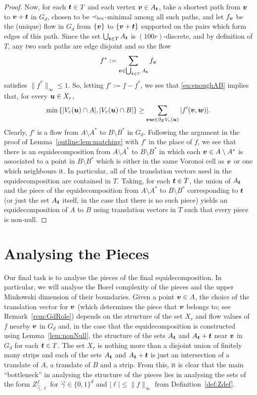 \documentclass[12pt,a4paper]{amsart}
\numberwithin{equation}{section}
\theoremstyle{definition}
\begin{document}
\begin{proof}
Now, for each $\boldsymbol{t}\in T$ and each vertex $\boldsymbol{v}\in A_{\boldsymbol{t}}$, take a shortest path from $\boldsymbol{v}$ to $\boldsymbol{v}+\boldsymbol{t}$ in $G_d$, chosen to be $\prec_{\operatorname{lex}}$-minimal among all such paths, and let $f_{\boldsymbol{v}}$ be the (unique) flow in $G_d$ from $\{\boldsymbol{v}\}$ to $\{\boldsymbol{v}+\boldsymbol{t}\}$ supported on the pairs which form edges of this path. Since the set $\bigcup_{\boldsymbol{t}\in T}A_{\boldsymbol{t}}$ is $(100r)$-discrete, and by definition of $T$, any two such paths are edge disjoint and so the flow
\[f^*:=\sum_{\boldsymbol{v}\in \bigcup_{\boldsymbol{t}\in T}A_{\boldsymbol{t}}}f_{\boldsymbol{v}}\]
satisfies $\|f^*\|_\infty\leq 1$. So, letting $f':= f-f^*$, we see that \eqref{eq:enoughAB} implies that, for every $\boldsymbol{u}\in X_r$,
\[\min\left\{|V_r(\boldsymbol{u})\cap A|,|V_r(\boldsymbol{u})\cap B|\right\}\geq \sum_{\boldsymbol{v}\boldsymbol{w}\in \partial_EV_r(\boldsymbol{u})}|f'(\boldsymbol{v},\boldsymbol{w})|.\]
Clearly, $f'$ is a flow from $A\setminus A^*$ to $B\setminus B^*$ in $G_d$. Following the argument in the proof of Lemma~\ref{outline:lem:matching} with $f'$ in the place of $f$, we see that there is an equidecomposition from $A\setminus A^*$ to $B\setminus B^*$ in which each $\boldsymbol{v}\in A\setminus A^*$ is associated to a point in $B\setminus B^*$ which is either in the same Voronoi cell as $\boldsymbol{v}$ or one which neighbours it. In particular, all of the translation vectors used in the equidecomposition are contained in $T$. Taking, for each $\boldsymbol{t}\in T$, the union of $A_{\boldsymbol{t}}$ and the piece of the equidecomposition from $A\setminus A^*$ to $B\setminus B^*$ corresponding to $\boldsymbol{t}$ (or just the set $A_{\boldsymbol{t}}$ itself, in the case that there is no such piece) yields an equidecomposition of $A$ to $B$ using translation vectors in $T$ such that every piece is non-null.
\end{proof}




\section{Analysing the Pieces}
\label{sec:pieces}

Our final task is to analyse the pieces of the final equidecomposition. In particular, we will analyse the Borel complexity of the pieces and the upper Minkowski dimension of their boundaries. Given a point $\boldsymbol{v}\in A$, the choice of the translation vector for $\boldsymbol{v}$ (which determines the piece that $\boldsymbol{v}$ belongs to; see Remark~\ref{rem:GdRole}) depends on the structure of the set $X_r$ and flow values of $f$ nearby $\boldsymbol{v}$ in $G_d$ and, in the case that the equidecomposition is constructed using Lemma~\ref{lem:nonNull}, the structure of the sets $A_{\boldsymbol{t}}$ and $A_{\boldsymbol{t}}+\boldsymbol{t}$ near $\boldsymbol{v}$ in $G_d$ for each $\boldsymbol{t}\in T$. The set $X_r$ is nothing more than a disjoint union of finitely many strips and each of the sets $A_{\boldsymbol{t}}$ and $A_{\boldsymbol{t}}+\boldsymbol{t}$ is just an intersection of a translate of $A$, a translate of $B$ and a strip. From this, it is clear that the main ``bottleneck'' in analysing the structure of the pieces lies in analysing the sets of the form $Z_{\vec{\gamma},\ell}^f$ for $\vec{\gamma}\in\{0,1\}^d$ and $|\ell|\leq \|f\|_\infty$ from Definition~\ref{def:Zdef}. 
\end{document}

